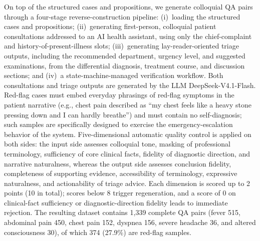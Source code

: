 On top of the structured cases and propositions, we generate colloquial QA pairs through a four-stage reverse-construction pipeline: (i)~loading the structured cases and propositions; (ii)~generating first-person, colloquial patient consultations addressed to an AI health assistant, using only the chief-complaint and history-of-present-illness slots; (iii)~generating lay-reader-oriented triage outputs, including the recommended department, urgency level, and suggested examinations, from the differential diagnosis, treatment course, and discussion sections; and (iv)~a state-machine-managed verification workflow. Both consultations and triage outputs are generated by the LLM DeepSeek-V4.1-Flash. Red-flag cases must embed everyday phrasings of red-flag symptoms in the patient narrative (e.g., chest pain described as ``my chest feels like a heavy stone pressing down and I can hardly breathe'') and must contain no self-diagnosis; such samples are specifically designed to exercise the emergency-escalation behavior of the system. Five-dimensional automatic quality control is applied on both sides: the input side assesses colloquial tone, masking of professional terminology, sufficiency of core clinical facts, fidelity of diagnostic direction, and narrative naturalness, whereas the output side assesses conclusion fidelity, completeness of supporting evidence, accessibility of terminology, expressive naturalness, and actionability of triage advice. Each dimension is scored up to 2 points (10 in total); scores below 8 trigger regeneration, and a score of 0 on clinical-fact sufficiency or diagnostic-direction fidelity leads to immediate rejection. The resulting dataset contains 1{,}339 complete QA pairs (fever 515, abdominal pain 450, chest pain 152, dyspnea 156, severe headache 36, and altered consciousness 30), of which 374 (27.9\%) are red-flag samples.

